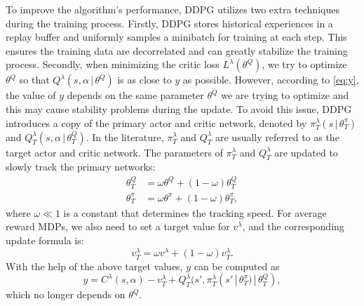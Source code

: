 \documentclass[lettersize, journal]{IEEEtran}
\begin{document}
To improve the algorithm's performance, DDPG utilizes two extra techniques during the training process.
Firstly, DDPG stores historical experiences in a replay buffer and uniformly samples a minibatch for training at each step.
This ensures the training data are decorrelated and can greatly stabilize the training process.
Secondly, when minimizing the critic loss $L^{\lambda}(\theta^Q)$, we try to optimize $\theta^Q$ so that 
$Q^{\lambda}(s,\alpha \, | \, \theta^Q)$ is as close to $y$ as possible.
However, according to \eqref{eq:y}, the value of $y$ depends on the same parameter $\theta^Q$ we are trying to optimize
and this may cause stability problems during the update.
To avoid this issue, DDPG introduces a copy of the primary actor and critic network, denoted by
$\pi_T^{\lambda}(s \, | \, \theta^{\pi}_T)$ and $Q_T^{\lambda}(s, \alpha \, | \, \theta^{Q}_T)$.
In the literature, $\pi_T^{\lambda}$ and $Q_T^{\lambda}$ are usually referred to as the target actor and critic network.
The parameters of $\pi_T^{\lambda}$ and $Q_T^{\lambda}$ are updated to slowly track the primary networks:
\begin{align}
    \theta^{Q}_T &= \omega \theta^Q + (1-\omega) \theta_T^{Q} \label{eq:target_critic} \\
    \theta^{\pi}_T &= \omega \theta^{\pi} + (1-\omega) \theta_T^{\pi}, \label{eq:target_actor}
\end{align}
where $\omega \ll 1$ is a constant that determines the tracking speed.
For average reward MDPs, we also need to set a target value for $v^{\lambda}$, and the corresponding update formula is:
\begin{equation}
    {v}_T^{\lambda} = \omega v^{\lambda} + (1-\omega) {v}_T^{\lambda}. \label{eq:target_average_reward}
\end{equation}
With the help of the above target values, $y$ can be computed as
\begin{equation*}
    y = C^{\lambda}(s,\alpha) - {v}_T^{\lambda} + {Q}_T^{\lambda}(s', {\pi}_T^{\lambda}(s' \, | \, \theta_T^{\pi}) \, | \, \theta_T^{Q}),
\end{equation*}
which no longer depends on $\theta^Q$.
\end{document}
